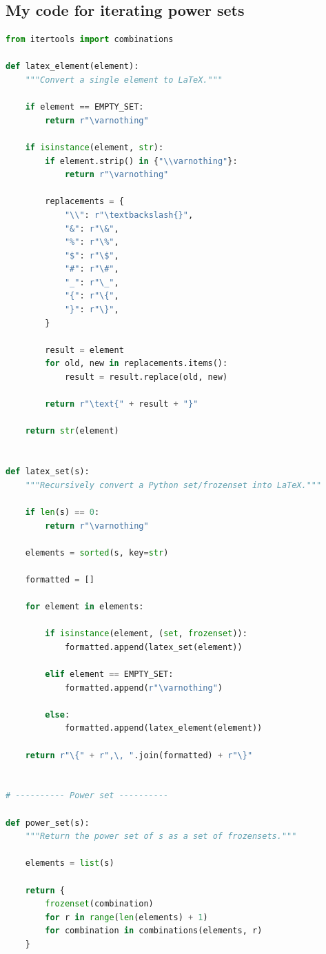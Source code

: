 \documentclass[12pt]{article}
\begin{document}
\subsection*{My code for iterating power sets}
\begin{lstlisting}[language=python]
from itertools import combinations

def latex_element(element):
    """Convert a single element to LaTeX."""

    if element == EMPTY_SET:
        return r"\varnothing"

    if isinstance(element, str):
        if element.strip() in {"\\varnothing"}:
            return r"\varnothing"

        replacements = {
            "\\": r"\textbackslash{}",
            "&": r"\&",
            "%": r"\%",
            "$": r"\$",
            "#": r"\#",
            "_": r"\_",
            "{": r"\{",
            "}": r"\}",
        }

        result = element
        for old, new in replacements.items():
            result = result.replace(old, new)

        return r"\text{" + result + "}"

    return str(element)


def latex_set(s):
    """Recursively convert a Python set/frozenset into LaTeX."""

    if len(s) == 0:
        return r"\varnothing"

    elements = sorted(s, key=str)

    formatted = []

    for element in elements:

        if isinstance(element, (set, frozenset)):
            formatted.append(latex_set(element))

        elif element == EMPTY_SET:
            formatted.append(r"\varnothing")

        else:
            formatted.append(latex_element(element))

    return r"\{" + r",\, ".join(formatted) + r"\}"


# ---------- Power set ----------

def power_set(s):
    """Return the power set of s as a set of frozensets."""

    elements = list(s)

    return {
        frozenset(combination)
        for r in range(len(elements) + 1)
        for combination in combinations(elements, r)
    }



\end{lstlisting}
\end{document}

